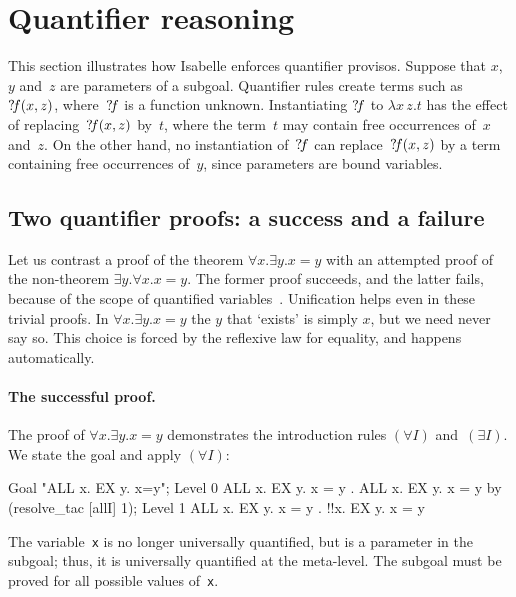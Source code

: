 \section{Quantifier reasoning}
This section illustrates how Isabelle enforces quantifier provisos.
Suppose that $x$, $y$ and~$z$ are parameters of a subgoal.  Quantifier
rules create terms such as~${?\!f}(x,z)$, where~${?\!f}$ is a function
unknown.  Instantiating ${?\!f}$ to $\lambda x\,z.t$ has the effect of
replacing~${?\!f}(x,z)$ by~$t$, where the term~$t$ may contain free
occurrences of~$x$ and~$z$.  On the other hand, no instantiation
of~${?\!f}$ can replace~${?\!f}(x,z)$ by a term containing free
occurrences of~$y$, since parameters are bound variables.

\subsection{Two quantifier proofs: a success and a failure}
Let us contrast a proof of the theorem $\forall x.\exists y.x=y$ with an
attempted proof of the non-theorem $\exists y.\forall x.x=y$.  The former
proof succeeds, and the latter fails, because of the scope of quantified
variables~\cite{paulson-found}.  Unification helps even in these trivial
proofs.  In $\forall x.\exists y.x=y$ the $y$ that `exists' is simply $x$,
but we need never say so.  This choice is forced by the reflexive law for
equality, and happens automatically.

\paragraph{The successful proof.}
The proof of $\forall x.\exists y.x=y$ demonstrates the introduction rules
$(\forall I)$ and~$(\exists I)$.  We state the goal and apply $(\forall I)$:
\begin{ttbox}
Goal "ALL x. EX y. x=y";
{\out Level 0}
{\out ALL x. EX y. x = y}
{. ALL x. EX y. x = y}
\ttbreak
by (resolve_tac [allI] 1);
{\out Level 1}
{\out ALL x. EX y. x = y}
{. !!x. EX y. x = y}
\end{ttbox}
The variable~\texttt{x} is no longer universally quantified, but is a
parameter in the subgoal; thus, it is universally quantified at the
meta-level.  The subgoal must be proved for all possible values of~\texttt{x}.

